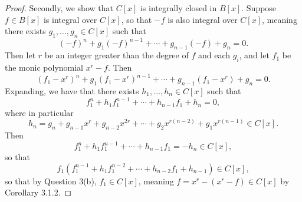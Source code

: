 \documentclass[10pt]{article}
\newcommand{\1}{\mbf 1}
\newcommand{\2}{\mbf 2}
\newcommand{\3}{\mbf 3}
\newcommand{\4}{\mbf 4}
\newcommand{\5}{\mbf 5}
\newcommand{\6}{\mbf 6}
\newcommand{\7}{\mbf 7}
\newcommand{\8}{\mbf 8}
\newcommand{\9}{\mbf 9}
\newcommand{\0}{\mbf 0}
\renewcommand{\(}{\left(}
\renewcommand{\)}{\right)}
\begin{document}
\begin{enumerate}[label=(\arabic*)]
\begin{proof}
        Secondly, we show that $C[x]$ is integrally closed in $B[x]$. Suppose $f\in B[x]$ is integral over $C[x]$, so that $-f$ is also integral over $C[x]$, meaning there exists $g_1,\ldots,g_n\in C[x]$ such that
        \[(-f)^n+g_1(-f)^{n-1}+\cdots+g_{n-1}(-f)+g_n=0.\]
        Then let $r$ be an integer greater than the degree of $f$ and each $g_i$, and let $f_1$ be the monic polynomial $x^r-f$. Then
        \[(f_1-x^r)^n+g_1(f_1-x^r)^{n-1}+\cdots+g_{n-1}(f_1-x^r)+g_n=0.\]
        Expanding, we have that there exists $h_1,\ldots,h_n\in C[x]$ such that
        \[f_1^n+h_1f_1^{n-1}+\cdots+h_{n-1}f_1+h_n=0,\]
        where in particular 
        \[h_n=g_n+g_{n-1}x^r+g_{n-2}x^{2r}+\cdots+g_2x^{r(n-2)}+g_1x^{r(n-1)}\in C[x].\]
        Then
        \[f_1^n+h_1f_1^{n-1}+\cdots+h_{n-1}f_1=-h_n\in C[x],\]
        so that
        \[f_1(f_1^{n-1}+h_1f_1^{n-2}+\cdots+h_{n-2}f_1+h_{n-1})\in C[x],\]
        so that by Question 3(b), $f_1\in C[x]$, meaning $f=x^r-(x^r-f)\in C[x]$ by Corollary 3.1.2.
    \end{proof}
\end{enumerate}
\end{document}
